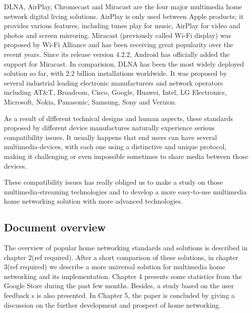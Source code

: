DLNA, AirPlay, Chromecast and Miracast are the four major multimedia home network
digital living solutions. AirPlay is only used between Apple products; it
provides various features, including tunes play for music, AirPlay for video
and photos and screen mirroring. Miracast (previously called Wi-Fi display) was
proposed by Wi-Fi Alliance and has been receiving great popularity over the recent years.
Since its release version 4.2.2, Android has officially added the support for Miracast. In comparision, DLNA has been the most widely deployed solution so far, with 2.2 billion installations worldwide.
It was proposed by several industrial leading electronic manufacturers and network operators 
including AT$\&$T, Broadcom, Cisco, Google, Huawei, Intel, LG Electronics, Microsoft, Nokia, 
Panasonic, Samsung, Sony and Verizon.

As a result of different technical designs and  human aspects, these standards proposed by
different device manufactures naturally experience serious compatibility issues. It usually happens that
end users can have several multimedia-devices, with each one using a distinctive and unique  protocol, making it challenging or even impossible sometimes to share media between those devices. 

These compatibility issues has really obliged us to make a study on those multimedia-streaming
 technologies and to develop a more easy-to-use multimedia home networking solution
 with more  advanced technologies.

\subsection{Document overview}
The overview of popular home networking standards and solutions is described in
chapter 2(ref required). After a short comparison of these solutions, in chapter 3(ref required) we
describe a more universal solution for multimedia home networking and its
implementation. Chapter 4 presents some statistics from the Google Store
during the past few months. Besides, a study based on the user feedback
s is also presented. In Chapter 5, the paper is concluded by giving a discussion on the further development and prospect of home networking.

